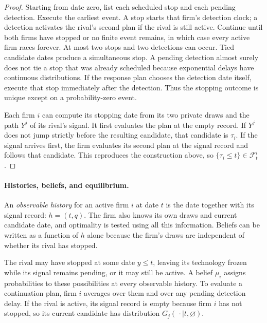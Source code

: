 \documentclass[12pt,reqno]{article}
\theoremstyle{definition} \newtheorem{example}{Example}
\theoremstyle{definition} \newtheorem{condition}{Condition}
\theoremstyle{definition} \newtheorem{corollary}{Corollary}
\theoremstyle{definition} \newtheorem{claim}{Claim}
\theoremstyle{definition} \newtheorem{definition}{Definition}
\theoremstyle{definition} \newtheorem{conjecture}{Conjecture}
\theoremstyle{definition} \newtheorem{Lemma}{Lemma}
\theoremstyle{definition} \newtheorem{lemma}{Lemma}
\theoremstyle{plain} \newtheorem{theorem}{Theorem}
\theoremstyle{definition} \newtheorem{assumption}{Assumption}
\theoremstyle{definition} \newtheorem*{assumptionnonumber}{Assumption}
\theoremstyle{definition} \newtheorem*{theoremNoNumber}{Proposition}
\theoremstyle{definition}
\theoremstyle{definition}\newtheorem{proposition}{Proposition}
\theoremstyle{definition} \newtheorem{result}{Result}
\theoremstyle{definition} \newtheorem*{definitionNoNumber}{Definition}
\theoremstyle{definition} \newtheorem{Definition}{Definition}
\theoremstyle{definition} \newtheorem*{DefinitionNoNumber}{Definition}
\theoremstyle{definition} \newtheorem*{fact}{Fact}
\theoremstyle{definition} \newtheorem*{property}{Property}
\theoremstyle{definition} \newtheorem{remark}{Remark}
\begin{document}
\begin{proof}
Starting from date zero, list each scheduled stop and each pending detection. Execute the earliest event. A stop starts that firm's detection clock; a detection activates the rival's second plan if the rival is still active. Continue until both firms have stopped or no finite event remains, in which case every active firm races forever. At most two stops and two detections can occur. Tied candidate dates produce a simultaneous stop. A pending detection almost surely does not tie a stop that was already scheduled because exponential delays have continuous distributions. If the response plan chooses the detection date itself, execute that stop immediately after the detection. Thus the stopping outcome is unique except on a probability-zero event.

Each firm $i$ can compute its stopping date from its two private draws and the path $Y^j$ of its rival's signal. It first evaluates the plan at the empty record. If $Y^j$ does not jump strictly before the resulting candidate, that candidate is $\tau_i$. If the signal arrives first, the firm evaluates its second plan at the signal record and follows that candidate. This reproduces the construction above, so $\{\tau_i\le t\}\in\mathcal F^i_t$.
\end{proof}

\paragraph{Histories, beliefs, and equilibrium.}
An \emph{observable history} for an active firm $i$ at date $t$ is the date together with its signal record: $h=(t,q)$. The firm also knows its own draws and current candidate date, and optimality is tested using all this information. Beliefs can be written as a function of $h$ alone because the firm's draws are independent of whether its rival has stopped.

The rival may have stopped at some date $y\le t$, leaving its technology frozen while its signal remains pending, or it may still be active. A belief $\mu_i$ assigns probabilities to these possibilities at every observable history. To evaluate a continuation plan, firm $i$ averages over them and over any pending detection delay. If the rival is active, its signal record is empty because firm $i$ has not stopped, so its current candidate has distribution $G_j(\,\cdot\mid t,\varnothing)$.
\end{document}
